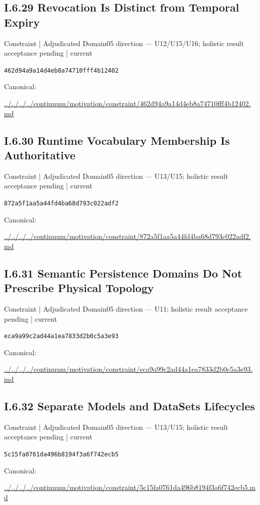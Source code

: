 \documentclass[10pt,a4paper]{article}
\begin{document}
\subsection*{I.6.29 Revocation Is Distinct from Temporal Expiry}
\label{element-462d94a9a14d4eb8a74710fff4b12402}
{\small Constraint | Adjudicated Domain05 direction — U12/U15/U16; holistic result acceptance pending | current}\par
\texttt{462d94a9a14d4eb8a74710fff4b12402}\par
Canonical: \par
{\footnotesize\url{../../../../continuum/motivation/constraint/462d94a9a14d4eb8a74710fff4b12402.md}}\par
\subsection*{I.6.30 Runtime Vocabulary Membership Is Authoritative}
\label{element-872a5f1aa5a44fd4ba68d793c022adf2}
{\small Constraint | Adjudicated Domain05 direction — U13/U15; holistic result acceptance pending | current}\par
\texttt{872a5f1aa5a44fd4ba68d793c022adf2}\par
Canonical: \par
{\footnotesize\url{../../../../continuum/motivation/constraint/872a5f1aa5a44fd4ba68d793c022adf2.md}}\par
\subsection*{I.6.31 Semantic Persistence Domains Do Not Prescribe Physical Topology}
\label{element-eca9a99c2ad44a1ea7833d2b0c5a3e93}
{\small Constraint | Adjudicated Domain05 direction — U11; holistic result acceptance pending | current}\par
\texttt{eca9a99c2ad44a1ea7833d2b0c5a3e93}\par
Canonical: \par
{\footnotesize\url{../../../../continuum/motivation/constraint/eca9a99c2ad44a1ea7833d2b0c5a3e93.md}}\par
\subsection*{I.6.32 Separate Models and DataSets Lifecycles}
\label{element-5c15fa0761da496b8194f3a6f742ecb5}
{\small Constraint | Adjudicated Domain05 direction — U13/U15; holistic result acceptance pending | current}\par
\texttt{5c15fa0761da496b8194f3a6f742ecb5}\par
Canonical: \par
{\footnotesize\url{../../../../continuum/motivation/constraint/5c15fa0761da496b8194f3a6f742ecb5.md}}\par
\end{document}
